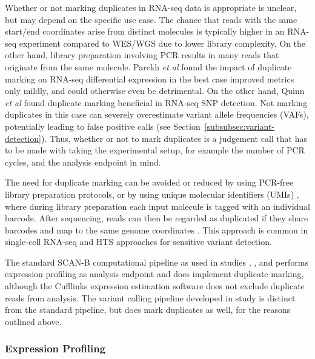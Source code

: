 \documentclass[11pt]{book}
\newcommand{\scanb}{\mbox{SCAN-B}}
\begin{document}
Whether or not marking duplicates in RNA-seq data is appropriate is unclear, but may depend on the specific use case.  The chance that reads with the same start/end coordinates arise from distinct molecules is typically higher in an RNA-seq experiment compared to WES/WGS due to lower library complexity. On the other hand, library preparation involving PCR results in many reads that originate from the same molecule. Parekh \textit{et al} \cite{Parekh:2016} found the impact of duplicate marking on RNA-seq differential expression in the best case improved metrics only mildly, and could otherwise even be detrimental. On the other hand, Quinn \textit{et al} \cite{Quinn:2013} found duplicate marking beneficial in RNA-seq SNP detection. Not marking duplicates in this case can severely overestimate variant allele frequencies (VAFs), potentially leading to false positive calls (see Section~\ref{subsubsec:variant-detection}). Thus, whether or not to mark duplicates is a judgement call that has to be made with taking the experimental setup, for example the number of PCR cycles, and the analysis endpoint in mind.

The need for duplicate marking can be avoided or reduced by using PCR-free library preparation protocols, or by using unique molecular identifiers (UMIs) \cite{Kivioja:2012}, where during library preparation each input molecule is tagged with an individual barcode. After sequencing, reads can then be regarded as duplicated if they share barcodes and map to the same genome coordinates \cite{Smith:2017, umis, fgbio}. This approach is common in single-cell RNA-seq \cite{Islam:2014} and HTS approaches for sensitive variant detection.

The standard \scanb{} computational pipeline as used in studies \I, \III, and \IV performs expression profiling as analysis endpoint and does implement duplicate marking, although the Cufflinks expression estimation software does not exclude duplicate reads from analysis. The variant calling pipeline developed in study \IV is distinct from the standard pipeline, but does mark duplicates as well, for the reasons outlined above.


\subsubsection*{Expression Profiling}
\end{document}
